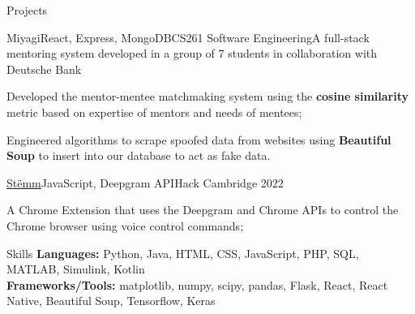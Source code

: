 \documentclass{resume}
\begin{document}
    \begin{rSection}{Projects}
        \begin{rSubsection}{Miyagi}{React, Express, MongoDB}{CS261 Software Engineering}{}{A full-stack mentoring system developed in a group of 7 students in collaboration with Deutsche Bank}
            \item Developed the mentor-mentee matchmaking system using the \textbf{cosine similarity} metric based on expertise of mentors and needs of mentees;
            \item Engineered algorithms to scrape spoofed data from websites using \textbf{Beautiful Soup} to insert into our database to act as fake data.
        \end{rSubsection}
        \begin{rSubsection}{\href{https://developers.deepgram.com/blog/2022/03/voice-control-browser-stemm/}{Stëmm}}{JavaScript, Deepgram API}{Hack Cambridge 2022}{}{}
            \item A Chrome Extension that uses the Deepgram and Chrome APIs to control the Chrome browser using voice control commands;
        \end{rSubsection}
    \end{rSection}
    \begin{rSection}{Skills}
        \textbf{Languages:} Python, Java, HTML, CSS, JavaScript, PHP, SQL, MATLAB, Simulink, Kotlin\\
        \textbf{Frameworks/Tools:} matplotlib, numpy, scipy, pandas, Flask, React, React Native, Beautiful Soup, Tensorflow, Keras \\ 
    \end{rSection}
\end{document}

